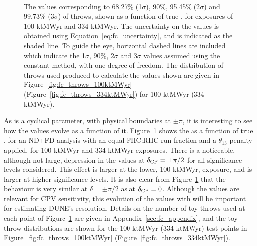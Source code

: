 \begin{figure}[htbp]
  \centering
  \\
  \caption{The \dchisqcrit values corresponding to 68.27\% (1$\sigma$), 90\%, 95.45\% (2$\sigma$) and 99.73\% (3$\sigma$) of throws, shown as a function of true \deltacp, for exposures of 100 ktMWyr and 334 ktMWyr. The uncertainty on the \dchisqcrit values is obtained using Equation~\ref{eq:fc_uncertainty}, and is indicated as the shaded line. To guide the eye, horizontal dashed lines are included which indicate the 1$\sigma$, 90\%, 2$\sigma$ and 3$\sigma$ \dchisq values assumed using the constant-\dchisq method, with one degree of freedom. The distribution of throws used produced to calculate the \dchisqcrit values shown are given in Figure~\ref{fig:fc_throws_100ktMWyr} (Figure~\ref{fig:fc_throws_334ktMWyr}) for 100 ktMWyr (334 ktMWyr).}
  \label{fig:fc_vs_dcp}
\end{figure}
As \deltacp is a cyclical parameter, with physical boundaries at $\pm\pi$, it is interesting to see how the \dchisqcrit values evolve as a function of it. Figure~\ref{fig:fc_vs_dcp} shows the \dchisqcrit as a function of true \deltacp, for an ND+FD analysis with an equal FHC:RHC run fraction and a $\theta_{13}$ penalty applied, for 100 ktMWyr and 334 ktMWyr exposures. There is a noticeable, although not large, depression in the \dchisqcrit values at $\delta_{\rm CP} = \pm\pi/2$ for all significance levels considered. This effect is larger at the lower, 100 ktMWyr, exposure, and is larger at higher significance levels. It is also clear from Figure~\ref{fig:fc_vs_dcp} that the \dchisqcrit behaviour is very similar at $\delta = \pm\pi/2$ as at $\delta_{\rm CP} = 0$. Although the \dchisqcrit values are relevant for CPV sensitivity, this evolution of the \dchisqcrit values with \deltacp will be important for estimating DUNE's \deltacp resolution. Details on the number of toy throws used at each point of Figure~\ref{fig:fc_vs_dcp} are given in Appendix~\ref{sec:fc_appendix}, and the toy throw distributions are shown for the 100 ktMWyr (334 ktMWyr) test points in Figure~\ref{fig:fc_throws_100ktMWyr} (Figure~\ref{fig:fc_throws_334ktMWyr}).

